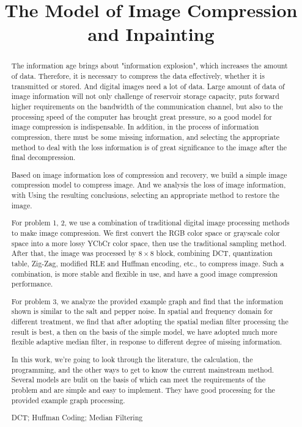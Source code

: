 \documentclass{mcmthesis}
\title{The Model of Image Compression and Inpainting}
\begin{document}
\begin{abstract}

The information age brings about "information explosion", which increases the amount of data. Therefore, it is necessary to compress the data effectively, whether it is transmitted or stored.
And digital images need a lot of data. Large amount of data of image information will not only challenge of reservoir storage capacity, puts forward higher requirements on the bandwidth of the communication channel, but also to the processing speed of the computer has brought great pressure, so a good model for image compression is indispensable.
In addition, in the process of information compression, there must be some missing information, and selecting the appropriate method to deal with the loss information is of great significance to the image after the final decompression.

Based on image information loss of compression and recovery, we build a simple image compression model to compress image. And we analysis the loss of image information, with Using the resulting conclusions, selecting an appropriate method to restore the image.

For problem 1, 2, we use a combination of traditional digital image processing methods to make image compression. 
We first convert the RGB color space or grayscale color space into a more lossy YCbCr color space, then use the traditional sampling method.
After that, the image was processed by $8\times 8$ block, combining DCT, quantization table, Zig-Zag, modified RLE and Huffman encoding, etc., to compress image. Such a combination, is more stable and flexible in use, and have a good image compression performance.

For problem 3, we analyze the provided example graph and find that the information shown is similar to the salt and pepper noise. In spatial and frequency domain for different treatment, we find that after adopting the spatial median filter processing the result is best, a then on the basis of the simple model, we have adopted much more flexible adaptive median filter, in response to different degree of missing information.

In this work, we're going to look through the literature, the calculation, the programming, and the other ways to get to know the current mainstream method.
Several models are bulit on the basis of which can meet the requirements of the problem and are simple and easy to implement. They have good processing for the provided example graph processing.
\begin{keywords}
DCT; Huffman Coding; Median Filtering
\end{keywords}
\end{abstract}
\maketitle
\tableofcontents
\newpage
\end{document}
